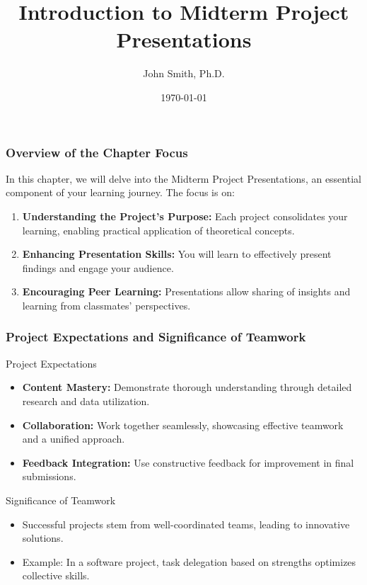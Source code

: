 \documentclass[aspectratio=169]{beamer}
\begin{document}
\frame{\titlepage}

\begin{frame}[fragile]
    \title{Introduction to Midterm Project Presentations}
    \author{John Smith, Ph.D.}
    \date{\today}
    \maketitle
\end{frame}

\begin{frame}[fragile]
    \frametitle{Overview of the Chapter Focus}
    
    In this chapter, we will delve into the Midterm Project Presentations, an essential component of your learning journey. The focus is on:
    
    \begin{enumerate}
        \item \textbf{Understanding the Project's Purpose:} Each project consolidates your learning, enabling practical application of theoretical concepts.
        \item \textbf{Enhancing Presentation Skills:} You will learn to effectively present findings and engage your audience.
        \item \textbf{Encouraging Peer Learning:} Presentations allow sharing of insights and learning from classmates’ perspectives.
    \end{enumerate}
\end{frame}

\begin{frame}[fragile]
    \frametitle{Project Expectations and Significance of Teamwork}
    
    \begin{block}{Project Expectations}
        \begin{itemize}
            \item \textbf{Content Mastery:} Demonstrate thorough understanding through detailed research and data utilization.
            \item \textbf{Collaboration:} Work together seamlessly, showcasing effective teamwork and a unified approach.
            \item \textbf{Feedback Integration:} Use constructive feedback for improvement in final submissions.
        \end{itemize}
    \end{block}
    
    \begin{block}{Significance of Teamwork}
        \begin{itemize}
            \item Successful projects stem from well-coordinated teams, leading to innovative solutions.
            \item Example: In a software project, task delegation based on strengths optimizes collective skills.
        \end{itemize}
    \end{block}
\end{frame}
\end{document}
